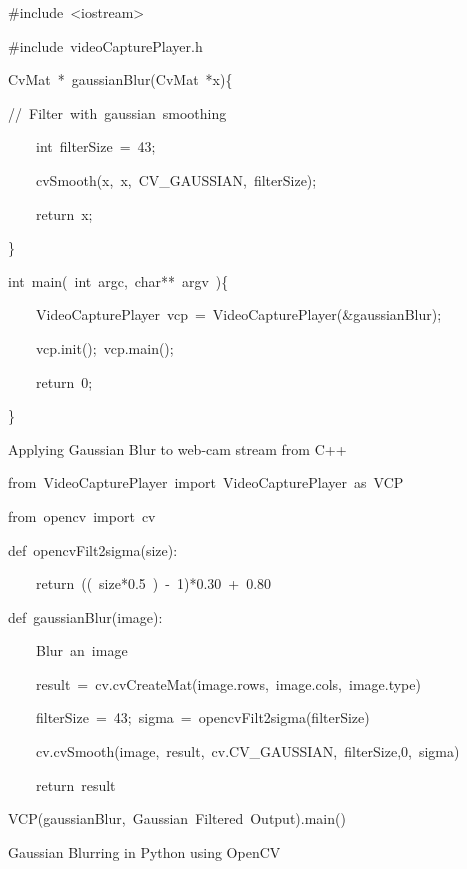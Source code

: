 \documentclass[english]{IEEEtran}
\theoremstyle{plain}
\newenvironment{lyxcode}
{\par\begin{list}{}{
\setlength{\rightmargin}{\leftmargin}
\setlength{\listparindent}{0pt}%
\raggedright
\setlength{\itemsep}{0pt}
\setlength{\parsep}{0pt}
\normalfont\ttfamily}%
 \item[]}
{\end{list}}
\begin{document}
%
\begin{algorithm*}
\begin{lyxcode}
\#include~<iostream>~

\#include~\textquotedbl{}videoCapturePlayer.h\textquotedbl{}



CvMat~{*}~gaussianBlur(CvMat~{*}x)\{

//~Filter~with~gaussian~smoothing

~~~~int~filterSize~=~43;

~~~~cvSmooth(x,~x,~CV\_GAUSSIAN,~filterSize);

~~~~return~x;

\}



int~main(~int~argc,~char{*}{*}~argv~)\{

~~~~VideoCapturePlayer~vcp~=~VideoCapturePlayer(\&gaussianBlur);

~~~~vcp.init();~vcp.main();

~~~~return~0;

\}
\end{lyxcode}
\caption{\label{alg:Gaussian-C}Applying Gaussian Blur to web-cam stream from
C++}

\end{algorithm*}


%
\begin{algorithm*}
\begin{lyxcode}
from~VideoCapturePlayer~import~VideoCapturePlayer~as~VCP

from~opencv~import~cv



def~opencvFilt2sigma(size):

~~~~return~((~size{*}0.5~)~-~1){*}0.30~+~0.80



def~gaussianBlur(image):

~~~~\textquotedbl{}\textquotedbl{}\textquotedbl{}Blur~an~image\textquotedbl{}\textquotedbl{}\textquotedbl{}~~~~~

~~~~result~=~cv.cvCreateMat(image.rows,~image.cols,~image.type)

~~~~filterSize~=~43;~sigma~=~opencvFilt2sigma(filterSize)

~~~~cv.cvSmooth(image,~result,~cv.CV\_GAUSSIAN,~filterSize,0,~sigma)

~~~~return~result





VCP(gaussianBlur,~\textquotedbl{}Gaussian~Filtered~Output\textquotedbl{}).main()
\end{lyxcode}
\caption{\label{alg:Gaussian-Python-OpenCV}Gaussian Blurring in Python using
OpenCV}

\end{algorithm*}
\end{document}
